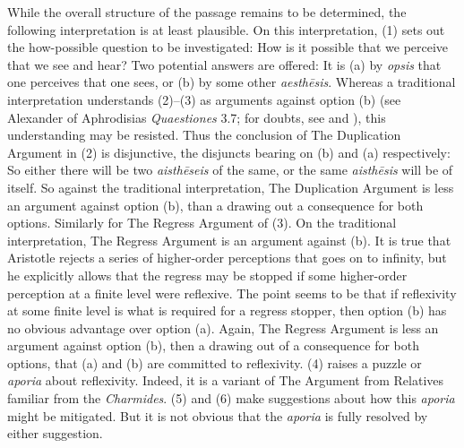 While the overall structure of the passage remains to be determined, the following interpretation is at least plausible. On this interpretation, (1) sets out the how-possible question to be investigated: How is it possible that we perceive that we see and hear? Two potential answers are offered: It is (a) by \emph{opsis} that one perceives that one sees, or (b) by some other \emph{aesthēsis}. Whereas a traditional interpretation understands (2)–(3) as arguments against option (b) (see Alexander of Aphrodisias \emph{Quaestiones} 3.7; for doubts, see \citealt{Kosman:2014ab} and \citealt{Osborne:1983le}), this understanding may be resisted. Thus the conclusion of The Duplication Argument in (2) is disjunctive, the disjuncts bearing on (b) and (a) respectively: So either there will be two \emph{aisthēseis} of the same, or the same \emph{aisthēsis} will be of itself. So against the traditional interpretation, The Duplication Argument is less an argument against option (b), than a drawing out a consequence for both options. Similarly for The Regress Argument of (3). On the traditional interpretation, The Regress Argument is an argument against (b). It is true that Aristotle rejects a series of higher-order perceptions that goes on to infinity, but he explicitly allows that the regress may be stopped if some higher-order perception at a finite level were reflexive. The point seems to be that if reflexivity at some finite level is what is required for a regress stopper, then option (b) has no obvious advantage over option (a). Again, The Regress Argument is less an argument against option (b), then a drawing out of a consequence for both options, that (a) and (b) are committed to reflexivity. (4) raises a puzzle or \emph{aporia} about reflexivity. Indeed, it is a variant of The Argument from Relatives familiar from the \emph{Charmides}. (5) and (6) make suggestions about how this \emph{aporia} might be mitigated. But it is not obvious that the \emph{aporia} is fully resolved by either suggestion.



